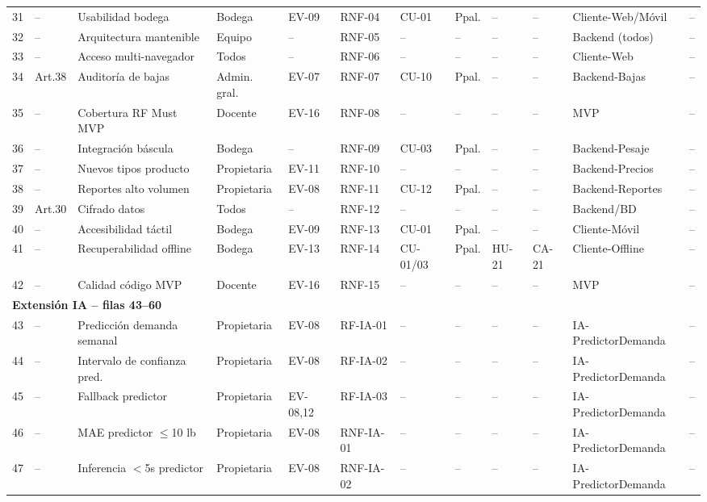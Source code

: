 \documentclass[11pt,a4paper]{article}
\begin{document}
\begin{longtable}{|p{0.3cm}|p{1.0cm}|p{1.9cm}|p{1.3cm}|p{0.6cm}|p{0.7cm}|p{0.6cm}|p{1.1cm}|p{0.6cm}|p{0.6cm}|p{2.0cm}|p{0.8cm}|}
31 & -- & Usabilidad bodega & Bodega & EV-09 & RNF-04 & CU-01 & Ppal. & -- & -- & Cliente-Web/Móvil & -- \\
32 & -- & Arquitectura mantenible & Equipo & -- & RNF-05 & -- & -- & -- & -- & Backend (todos) & -- \\
33 & -- & Acceso multi-navegador & Todos & -- & RNF-06 & -- & -- & -- & -- & Cliente-Web & -- \\
34 & Art.38 & Auditoría de bajas & Admin. gral. & EV-07 & RNF-07 & CU-10 & Ppal. & -- & -- & Backend-Bajas & -- \\
35 & -- & Cobertura RF Must MVP & Docente & EV-16 & RNF-08 & -- & -- & -- & -- & MVP & -- \\
36 & -- & Integración báscula & Bodega & -- & RNF-09 & CU-03 & Ppal. & -- & -- & Backend-Pesaje & -- \\
37 & -- & Nuevos tipos producto & Propietaria & EV-11 & RNF-10 & -- & -- & -- & -- & Backend-Precios & -- \\
38 & -- & Reportes alto volumen & Propietaria & EV-08 & RNF-11 & CU-12 & Ppal. & -- & -- & Backend-Reportes & -- \\
39 & Art.30 & Cifrado datos & Todos & -- & RNF-12 & -- & -- & -- & -- & Backend/BD & -- \\
40 & -- & Accesibilidad táctil & Bodega & EV-09 & RNF-13 & CU-01 & Ppal. & -- & -- & Cliente-Móvil & -- \\
41 & -- & Recuperabilidad offline & Bodega & EV-13 & RNF-14 & CU-01/03 & Ppal. & HU-21 & CA-21 & Cliente-Offline & -- \\
42 & -- & Calidad código MVP & Docente & EV-16 & RNF-15 & -- & -- & -- & -- & MVP & -- \\
\hline
\multicolumn{11}{|l|}{\textbf{Extensión IA -- filas 43--60}} \\
\hline
43 & -- & Predicción demanda semanal & Propietaria & EV-08 & RF-IA-01 & -- & -- & -- & -- & IA-PredictorDemanda & -- \\
44 & -- & Intervalo de confianza pred. & Propietaria & EV-08 & RF-IA-02 & -- & -- & -- & -- & IA-PredictorDemanda & -- \\
45 & -- & Fallback predictor & Propietaria & EV-08,12 & RF-IA-03 & -- & -- & -- & -- & IA-PredictorDemanda & -- \\
46 & -- & MAE predictor $\leq$10 lb & Propietaria & EV-08 & RNF-IA-01 & -- & -- & -- & -- & IA-PredictorDemanda & -- \\
47 & -- & Inferencia $<$5s predictor & Propietaria & EV-08 & RNF-IA-02 & -- & -- & -- & -- & IA-PredictorDemanda & -- \\

\end{longtable}
\end{document}
